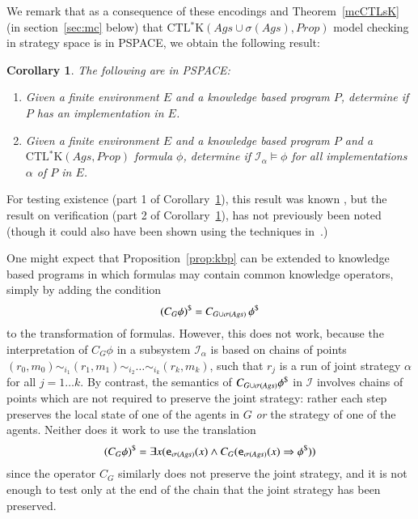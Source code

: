 \documentclass[a4wide]{article}
\newcommand{\CTLsK}{\mbox{CTL$^*$K}}
\newcommand{\Prop}{Prop}
\newtheorem{cor}{Corollary}
\theoremstyle{examplesty}
\newcommand{\strat}{\sigma}
\newcommand{\Ags}{\mathit{Ags}}
\newcommand{\I}{\mathcal{I}}
\newcommand{\lid}[2]{\mathtt{e}_{#1}(#2)}
\newcommand{\rimp}{\Rightarrow}
\newcommand{\Env}{E}
\begin{document}
We remark that as a consequence of these encodings and 
Theorem~\ref{mcCTLsK} (in section~\ref{sec:mc} below) that 
$\CTLsK(\Ags \cup \strat(\Ags), \Prop)$ 
model checking 
in strategy space 
is in PSPACE,  
we obtain the following result: 

\begin{cor} \label{cor:kbpcomplex}
The following are in PSPACE: 
\begin{enumerate} 
\item Given a finite environment $\Env$ and a knowledge based program $P$, determine if $P$ has an implementation in $\Env$. 
\item Given a finite environment $\Env$ and a knowledge based program $P$ and a  $\CTLsK(\Ags, \Prop)$  formula $\phi$, 
determine if $\I_\alpha \models \phi$ for all implementations $\alpha$ of $P$ in $\Env$. 
\end{enumerate} 
\end{cor} 



For testing existence 
(part 1 of Corollary~\ref{cor:kbpcomplex}), 
this result was known \cite{FHMV1997}, 
but the result on verification 
(part 2 of Corollary~\ref{cor:kbpcomplex}), 
has not previously been noted
(though it  could also have been shown using 
the techniques in~\cite{FHMV1997}.)  

One might expect that Proposition~\ref{prop:kbp} can be extended to 
knowledge based programs in which formulas may contain common knowledge 
operators, simply by adding the condition  
$$ \trlk{(C_G \phi)} = C_{G\cup \strat(\Ags)}\, \trlk{\phi}$$ 
to the transformation of formulas. However, this does not
work, because the interpretation of $C_G\phi$ in a subsystem $\I_\alpha$ 
is based on  chains of points $(r_0,m_0) \sim_{i_1}   (r_1,m_1) \sim_{i_2}  \ldots \sim_{i_k}  (r_k,m_k)$, 
such that $r_j$ is a run of joint strategy $\alpha$ for all $j=1\ldots k$. 
By contrast, the semantics  of $C_{G\cup \strat(\Ags)} \trlk{\phi}$ in $\I$ 
involves chains of points which are not required to preserve the joint strategy: 
rather each step preserves the local state of one of the agents in $G$ \emph{or} the strategy of one of the agents.  
Neither does it work to use the translation 
$$ \trlk{(C_G\phi)} = \exists x( \lid{\strat(\Ags)}{x} \land C_G(\lid{\strat(\Ags)}{x} \rimp \trlk{\phi}))$$
since the operator $C_G$ similarly does not preserve the joint strategy, and it is not 
enough to test only at the end of the chain that the joint strategy has been preserved. 
\end{document}
